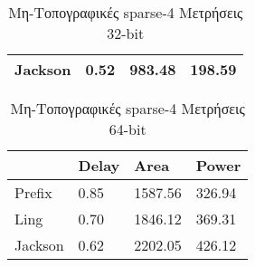 \begin{multicols}{2}
\begin{table}[H]
\begin{tabular}{||p{1.2cm} | p{0.7cm} p{1cm} p{1cm} ||}
        Jackson & 0.52  & 983.48    & 198.59 \\
        \hline
    \end{tabular}
\caption{Μη-Τοπογραφικές sparse-4 Μετρήσεις 32-bit}
\label{topo_sparse4_result_table_32}
\end{table}
\begin{table}[H]
\centering
     \begin{tabular}{||p{1.2cm} | p{0.7cm} p{1cm} p{1cm} ||} 
        \hline
         & Delay & Area & Power \\ [0.5ex] 
        \hline\hline
        Prefix  & 0.85  & 1587.56    & 326.94 \\ 
        \hline
        Ling    & 0.70  & 1846.12    & 369.31 \\
        \hline
        Jackson & 0.62  & 2202.05    & 426.12 \\
        \hline
    \end{tabular}
\caption{Μη-Τοπογραφικές sparse-4 Μετρήσεις 64-bit}
\label{topo_sparse4_result_table_64}
\end{table}
\end{multicols}
















